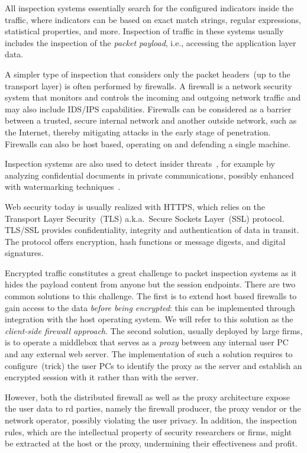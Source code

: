 \documentclass{sig-alternate-10pt}
\begin{document}
All inspection systems essentially search for the configured indicators inside the traffic, where indicators can be based on exact match strings, 
regular expressions, statistical properties, and more. Inspection of traffic in these systems usually includes the inspection of the \emph{packet payload}, i.e., accessing the application layer data. 

A simpler type of inspection that considers only the packet headers~(up to the transport layer) is often performed by firewalls. 
A firewall is a network security system that monitors and controls the incoming and outgoing network traffic and may also include IDS/IPS capabilities. Firewalls can be considered  as a barrier between a trusted, secure internal network and another outside network, such as the Internet, thereby mitigating attacks in the early stage of penetration. Firewalls can also be host based, operating on and defending a single machine. 

Inspection systems are also used to detect insider threats~\cite{insi-3}, 
for example by analyzing confidential
documents in private communications, 
possibly enhanced with watermarking techniques~\cite{encryptedweb}.

Web security today is usually realized with HTTPS,
which relies on the
Transport Layer Security~(TLS)  a.k.a.~Secure Sockets Layer~(SSL)
protocol. TLS/SSL 
provides
confidentiality, integrity and authentication of data in transit.
The protocol offers 
encryption, hash functions or message digests, and digital signatures.

Encrypted traffic constitutes a great challenge to packet inspection systems as it hides the payload content from anyone but the session endpoints. 
There are two common 
solutions to this challenge. 
The first is to extend host based firewalls to gain access to the data \emph{before being encrypted}: this can be implemented through integration with the host operating system. 
We will refer to this solution as the \emph{client-side firewall approach}.
The second solution, usually deployed by large firms, is to operate a middlebox that serves as a \emph{proxy} between any internal user PC and any external web server. The implementation of such a solution requires to configure~(trick) the user PCs to identify the proxy as the server and establish an encrypted session with it rather than with the server.

However, both the distributed firewall as well as the proxy architecture 
expose the user data to rd parties, 
namely the firewall producer, the proxy vendor or the network operator, possibly violating the user privacy. In addition, the inspection rules, which are 
the intellectual property of security researchers or firms, might be extracted at the host or the proxy, undermining their effectiveness and profit.
\end{document}
